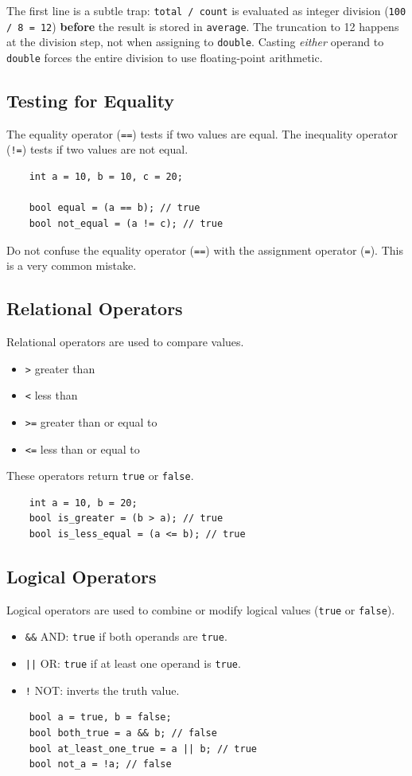 \begin{remark}
	The first line is a subtle trap: \texttt{total / count} is evaluated as integer division (\texttt{100 / 8 = 12}) \textbf{before} the result is stored in \texttt{average}. The truncation to 12 happens at the division step, not when assigning to \texttt{double}. Casting \textit{either} operand to \texttt{double} forces the entire division to use floating-point arithmetic.
\end{remark}

\subsection{Testing for Equality}
The equality operator (\texttt{==}) tests if two values are equal. The inequality operator (\texttt{!=}) tests if two values are not equal.
\begin{lstlisting}
	int a = 10, b = 10, c = 20;

	bool equal = (a == b); // true
	bool not_equal = (a != c); // true
\end{lstlisting}
\begin{remark}
	Do not confuse the equality operator (\texttt{==}) with the assignment operator (\texttt{=}). This is a very common mistake.
\end{remark}

\subsection{Relational Operators}
Relational operators are used to compare values.
\begin{itemize}
	\item \texttt{>} greater than
	\item \texttt{<} less than
	\item \texttt{>=} greater than or equal to
	\item \texttt{<=} less than or equal to
\end{itemize}
These operators return \texttt{true} or \texttt{false}.
\begin{lstlisting}
	int a = 10, b = 20;
	bool is_greater = (b > a); // true
	bool is_less_equal = (a <= b); // true
\end{lstlisting}

\subsection{Logical Operators}
Logical operators are used to combine or modify logical values (\texttt{true} or \texttt{false}).
\begin{itemize}
	\item \texttt{\&\&} AND: \texttt{true} if both operands are \texttt{true}.
	\item \texttt{||} OR: \texttt{true} if at least one operand is \texttt{true}.
	\item \texttt{!} NOT: inverts the truth value.
\end{itemize}
\begin{lstlisting}
	bool a = true, b = false;
	bool both_true = a && b; // false
	bool at_least_one_true = a || b; // true
	bool not_a = !a; // false
\end{lstlisting}


